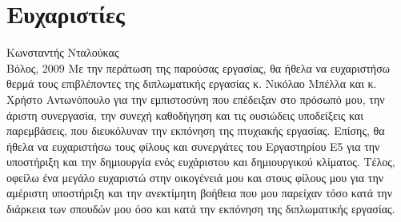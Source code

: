 ﻿\thispagestyle{plain}
\chapter*{Ευχαριστίες}
\begin{wbepi}{Κωνσταντής Νταλούκας\\ Βόλος, 2009}
Με την περάτωση της παρούσας εργασίας, θα ήθελα να ευχαριστήσω θερμά τους επιβλέποντες της διπλωματικής εργασίας
κ. Νικόλαο Μπέλλα και κ. Χρήστο Αντωνόπουλο για την εμπιστοσύνη που επέδειξαν στο πρόσωπό μου, την άριστη συνεργασία, την συνεχή καθοδήγηση και τις ουσιώδεις υποδείξεις και παρεμβάσεις, που διευκόλυναν την εκπόνηση της πτυχιακής εργασίας.\newline
Επίσης, θα ήθελα να ευχαριστήσω τους φίλους και συνεργάτες του Εργαστηρίου Ε5 για την υποστήριξη και την δημιουργία
ενός ευχάριστου και δημιουργικού κλίματος.\newline
Τέλος, οφείλω ένα μεγάλο ευχαριστώ στην οικογένειά μου και στους φίλους μου για την αμέριστη υποστήριξη και την ανεκτίμητη βοήθεια που μου παρείχαν τόσο κατά την διάρκεια των σπουδών μου όσο και κατά την εκπόνηση της διπλωματικής εργασίας.
\end{wbepi} 